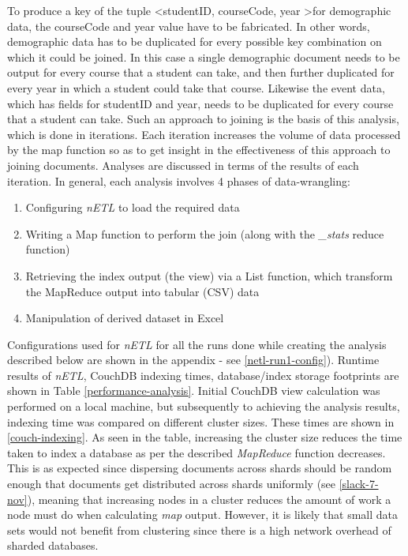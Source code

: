 To produce a key of the tuple \textless studentID, courseCode, year \textgreater for demographic data, the courseCode and year value have to be fabricated. In other words, demographic data has to be duplicated for every possible key combination on which it could be joined. In this case a single demographic document needs to be output for every course that a student can take, and then further duplicated for every year in which a student could take that course. Likewise the event data, which has fields for studentID and year, needs to be duplicated for every course that a student can take. Such an approach to joining is the basis of this analysis, which is done in iterations. Each iteration increases the volume of data processed by the map function so as to get insight in the effectiveness of this approach to joining documents. Analyses are discussed in terms of the results of each iteration. In general, each analysis involves 4 phases of data-wrangling:

\begin{enumerate}
    \item Configuring \textit{nETL} to load the required data
    \item Writing a Map function to perform the join (along with the \textit{\_stats} reduce function)
    \item Retrieving the index output (the view) via a List function, which transform the MapReduce output into tabular (CSV) data
    \item Manipulation of derived dataset in Excel
\end{enumerate}

Configurations used for \textit{nETL} for all the runs done while creating the analysis described below are shown in the appendix - see \ref{netl-run1-config}). Runtime results of \textit{nETL}, CouchDB indexing times, database/index storage footprints are shown in Table \ref{performance-analysis}. Initial CouchDB view calculation was performed on a local machine, but subsequently to achieving the analysis results, indexing time was compared on different cluster sizes. These times are shown in \ref{couch-indexing}. As seen in the table, increasing the cluster size reduces the time taken to index a database as per the described \textit{MapReduce} function decreases. This is as expected since dispersing documents across shards should be random enough that documents get distributed across shards uniformly (see \ref{slack-7-nov}), meaning that increasing nodes in a cluster reduces the amount of work a node must do when calculating \textit{map} output. However, it is likely that small data sets would not benefit from clustering since there is a high network overhead of sharded databases.

